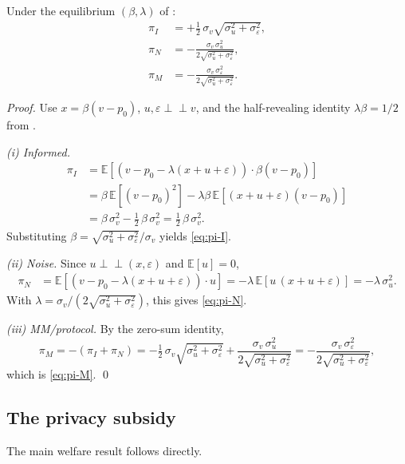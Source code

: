\documentclass[runningheads]{llncs}
\newcommand{\E}{\mathbb{E}}
\newcommand{\indep}{\perp\!\!\!\perp}
\newcommand{\sigv}{\sigma_v}
\newcommand{\sigu}{\sigma_u}
\newcommand{\sige}{\sigma_\varepsilon}
\begin{document}
\begin{lemma}
\label{lem:pl}
Under the equilibrium $(\beta, \lambda)$ of :
\begin{align}
\pi_I &= +\tfrac{1}{2}\,\sigv\sqrt{\sigu^2 + \sige^2}, \label{eq:pi-I} \\
\pi_N &= -\frac{\sigv\,\sigu^2}{2\sqrt{\sigu^2+\sige^2}}, \label{eq:pi-N} \\
\pi_M &= -\frac{\sigv\,\sige^2}{2\sqrt{\sigu^2+\sige^2}}. \label{eq:pi-M}
\end{align}
\end{lemma}

\begin{proof}
Use $x = \beta(v - p_0)$, $u, \varepsilon \indep v$, and the
half-revealing identity $\lambda\beta = 1/2$ from
.

\emph{(i) Informed.}
\begin{align*}
\pi_I &= \E[(v - p_0 - \lambda(x + u + \varepsilon)) \cdot \beta(v - p_0)] \\
      &= \beta\,\E[(v-p_0)^2] - \lambda\beta\,\E[(x+u+\varepsilon)(v-p_0)] \\
      &= \beta\,\sigv^2 - \tfrac{1}{2}\,\beta\,\sigv^2
       = \tfrac{1}{2}\,\beta\,\sigv^2.
\end{align*}
Substituting $\beta = \sqrt{\sigu^2+\sige^2}/\sigv$ yields
\eqref{eq:pi-I}.

\emph{(ii) Noise.} Since $u \indep (x, \varepsilon)$ and
$\E[u] = 0$,
\begin{align*}
\pi_N &= \E[(v - p_0 - \lambda(x+u+\varepsilon)) \cdot u]
       = -\lambda\,\E[u\,(x+u+\varepsilon)]
       = -\lambda\,\sigu^2.
\end{align*}
With $\lambda = \sigv/(2\sqrt{\sigu^2+\sige^2})$, this gives
\eqref{eq:pi-N}.

\emph{(iii) MM/protocol.} By the zero-sum identity,
\[
\pi_M = -(\pi_I + \pi_N)
      = -\tfrac{1}{2}\,\sigv\sqrt{\sigu^2+\sige^2}
        + \frac{\sigv\,\sigu^2}{2\sqrt{\sigu^2+\sige^2}}
      = -\frac{\sigv\,\sige^2}{2\sqrt{\sigu^2+\sige^2}},
\]
which is \eqref{eq:pi-M}. \qed
\end{proof}

\subsection{The privacy subsidy}

The main welfare result follows directly.
\end{document}
